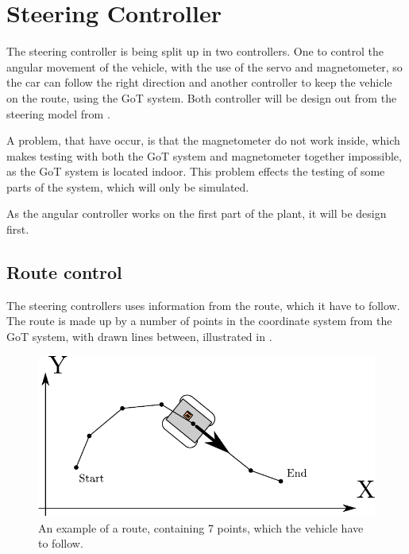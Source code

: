 \section{Steering Controller}\label{sec:steeringController}
The steering controller is being split up in two controllers. One to control the angular movement of the vehicle, with the use of the servo and magnetometer, so the car can follow the right direction and another controller to keep the vehicle on the route, using the GoT system. Both controller will be design out from the steering model from . 

A problem, that have occur, is that the magnetometer do not work inside, which makes testing with both the GoT system and magnetometer together impossible, as the GoT system is located indoor. This problem effects the testing of some parts of the system, which will only be simulated.

As the angular controller works on the first part of the plant, it will be design first.





\subsection{Route control}
The steering controllers uses information from the route, which it have to follow. The route is made up by a number of points in the coordinate system from the GoT system, with drawn lines between, illustrated in .

\begin{figure}[H]
 	\centering
 	\includegraphics[scale=0.7]{figures/stepsGoT}
 	\caption{An example of a route, containing 7 points, which the vehicle have to follow.}
 	\label{fig:RCfig1}
\end{figure}

